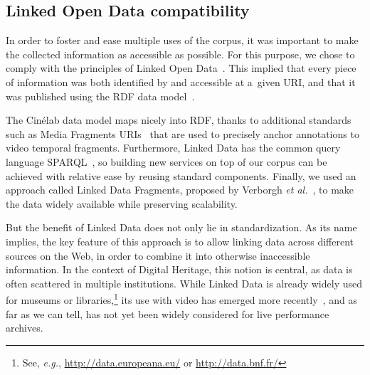 \documentclass[conference]{IEEEtran}
\begin{document}

\subsection{Linked Open Data compatibility}
In order to foster and ease multiple uses of the corpus,
it was important to make the collected information as accessible as possible.
For this purpose, we chose to comply with the principles of Linked Open Data~\cite{bernerslee2006linkeddata}.
This implied that every piece of information was both identified by and accessible at a~given URI, and that it 
was published using the RDF data model~\cite{cyganiak2014rdf11concepts}.

The Cinélab data model maps nicely into RDF, thanks to additional standards such as Media Fragments URIs~\cite{troncy2012mediafragments} that are used to precisely anchor annotations to video temporal fragments. Furthermore, Linked Data has the common query language SPARQL~\cite{prudhommeaux2008sparql}, so building new services on top of our corpus can be achieved with relative ease by reusing standard components. Finally, we used an approach called Linked Data Fragments, proposed by Verborgh \emph{et al.}~\cite{verborgh2014querying}, to make the data widely
available while preserving scalability.

But the benefit of Linked Data does not only lie in standardization. As its name implies, the key feature of this approach is to allow linking data across different sources on the Web, in order to combine it into otherwise inaccessible information. In the context of Digital Heritage, this notion is central, as data is often scattered in multiple institutions. While Linked Data is already widely used for museums or libraries,\footnote{
See, \emph{e.g.}, \url{http://data.europeana.eu/} or \url{http://data.bnf.fr/}}
its use with video has emerged more recently~\cite{vandeursen2012mediafragmentannotations,steiner2014webvtt},
and as far as we can tell, has not yet been widely considered for live performance archives.


\end{document}

